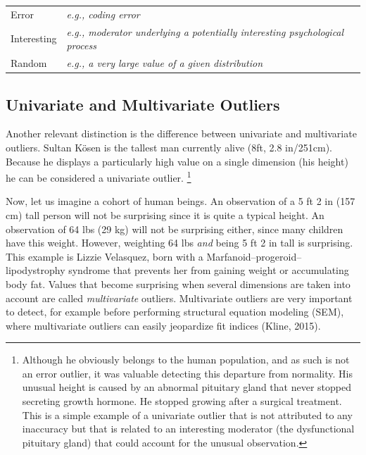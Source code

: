 \documentclass[man,floatsintext]{apa6}
\let\rmarkdownfootnote\footnote%
\def\footnote{\protect\rmarkdownfootnote}
\begin{document}
\begin{longtable}[]{@{}ll@{}}
\toprule
\begin{minipage}[t]{0.16\columnwidth}\raggedright\strut
Error\strut
\end{minipage} & \begin{minipage}[t]{0.78\columnwidth}\raggedright\strut
\emph{e.g., coding error}\strut
\end{minipage}\tabularnewline
\begin{minipage}[t]{0.16\columnwidth}\raggedright\strut
Interesting\strut
\end{minipage} & \begin{minipage}[t]{0.78\columnwidth}\raggedright\strut
\emph{e.g., moderator underlying a potentially interesting psychological
process}\strut
\end{minipage}\tabularnewline
\begin{minipage}[t]{0.16\columnwidth}\raggedright\strut
Random\strut
\end{minipage} & \begin{minipage}[t]{0.78\columnwidth}\raggedright\strut
\emph{e.g., a very large value of a given distribution}\strut
\end{minipage}\tabularnewline
\bottomrule
\end{longtable}

\subsection{Univariate and Multivariate
Outliers}\label{univariate-and-multivariate-outliers}

Another relevant distinction is the difference between univariate and
multivariate outliers. Sultan Kösen is the tallest man currently alive
(8ft, 2.8 in/251cm). Because he displays a particularly high value on a
single dimension (his height) he can be considered a univariate outlier.
\footnote{Although he obviously belongs to the human population, and as such is not an error outlier, it was valuable detecting this departure from normality. His unusual height is caused by an abnormal pituitary gland that never stopped secreting growth hormone. He stopped growing after a surgical treatment. This is a simple example of a univariate outlier that is not attributed to any inaccuracy but that is related to an interesting moderator (the dysfunctional pituitary gland) that could account for the unusual observation.}

Now, let us imagine a cohort of human beings. An observation of a 5 ft 2
in (157 cm) tall person will not be surprising since it is quite a
typical height. An observation of 64 lbs (29 kg) will not be surprising
either, since many children have this weight. However, weighting 64 lbs
\emph{and} being 5 ft 2 in tall is surprising. This example is Lizzie
Velasquez, born with a Marfanoid--progeroid--lipodystrophy syndrome that
prevents her from gaining weight or accumulating body fat. Values that
become surprising when several dimensions are taken into account are
called \emph{multivariate} outliers. Multivariate outliers are very
important to detect, for example before performing structural equation
modeling (SEM), where multivariate outliers can easily jeopardize fit
indices (Kline, 2015).
\end{document}

